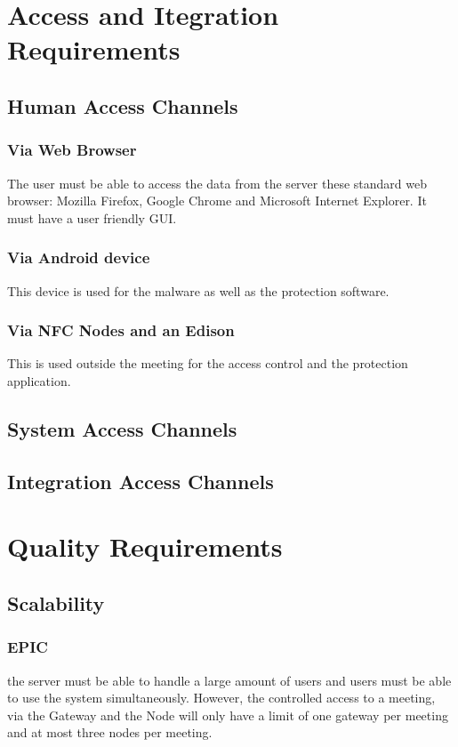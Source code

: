 \documentclass[a4paper,12pt,titlepage]{article}
\begin{document}
	
	
	\newpage
	\tableofcontents

\newpage	\section{Access and Itegration Requirements}
		\subsection{Human Access Channels}
 			\subsubsection{Via Web Browser}
The user must be able to access the data from the server these standard web browser: Mozilla Firefox, Google Chrome and Microsoft Internet Explorer. It must have a user friendly GUI.
 			\subsubsection{Via Android device}
This device is used for the malware as well as the protection software.
 			\subsubsection{Via NFC Nodes and an Edison}
This is used outside the meeting for the access control and the protection application.
		\subsection{System Access Channels}


		\subsection{Integration Access Channels}



\newpage	\section{Quality Requirements}
\subsection{Scalability}
\subsubsection{EPIC} the server must be able to handle a large amount of users and users must be able to use the system simultaneously. However, the controlled access to a meeting, via the Gateway and the Node will only have a limit of one gateway per meeting and at most three nodes per meeting.
\end{document}
